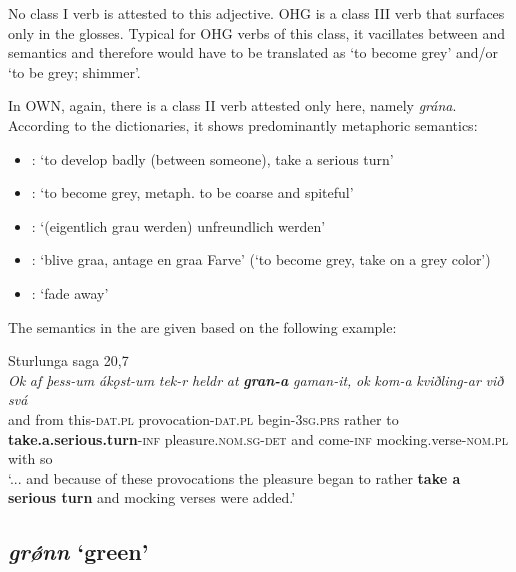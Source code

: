 \documentclass[output=paper,colorlinks,citecolor=brown]{langscibook}
\begin{document}
No class I verb is attested to this adjective. OHG  is a class III verb that surfaces only in the glosses. Typical for OHG verbs of this class, it vacillates between  and  semantics and therefore would have to be translated as ‘to become grey’ and/or ‘to be grey; shimmer’. 

In OWN, again, there is a class II verb attested only here, namely \textit{grána}. According to the dictionaries, it shows predominantly metaphoric semantics:

\begin{itemize}
\item {}: ‘to develop badly (between someone), take a serious turn’
\item {}: ‘to become grey, metaph. to be coarse and spiteful’
\item {}: ‘(eigentlich grau werden) unfreundlich werden’
\item {}: ‘blive graa, antage en graa Farve' (‘to become grey, take on a grey color’)
\item {}: ‘fade away’
\end{itemize}

The semantics in the  are given based on the following example:
 
\begin{exe} 
    \ex Sturlunga saga 20,7 \label{ex:grana}\\
    \gll \textit{Ok} \textit{af} \textit{þess-um} \textit{ákǫst-um} \textit{tek-r} \textit{heldr} \textit{at} {\textit{\textbf{gran-a}} } \textit{gaman-it,} \textit{ok} \textit{kom-a} \textit{kviðling-ar} \textit{við} \textit{svá}\\
      and from this-\textsc{dat.pl} provocation-\textsc{dat.pl} begin-\textsc{3sg.prs} rather to \textbf{take.a.serious.turn}\textsc{-inf} pleasure.\textsc{nom.sg-det} and come-\textsc{inf} {mocking.verse-\textsc{nom.pl}} with so\\
    \glt ‘... and because of these provocations the pleasure began to rather \textbf{take a serious turn} and mocking verses were added.’
\end{exe} 

\subsection{\textit{grǿnn} ‘green’}
\label{sec:OWNgreen}
\end{document}
